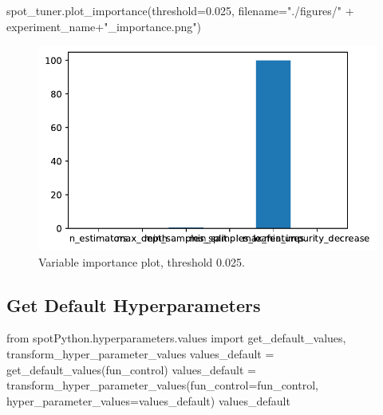 \documentclass[
  letterpaper,
  DIV=11,
  numbers=noendperiod]{scrreprt}
\newenvironment{Shaded}{\begin{snugshade}}{\end{snugshade}}
\newcommand{\FloatTok}[1]{\textcolor[rgb]{0.68,0.00,0.00}{#1}}
\newcommand{\ImportTok}[1]{\textcolor[rgb]{0.00,0.46,0.62}{#1}}
\newcommand{\NormalTok}[1]{\textcolor[rgb]{0.00,0.23,0.31}{#1}}
\newcommand{\OperatorTok}[1]{\textcolor[rgb]{0.37,0.37,0.37}{#1}}
\newcommand{\StringTok}[1]{\textcolor[rgb]{0.13,0.47,0.30}{#1}}
\begin{document}
\begin{Shaded}
\begin{Highlighting}[]
\NormalTok{spot\_tuner.plot\_importance(threshold}\OperatorTok{=}\FloatTok{0.025}\NormalTok{, filename}\OperatorTok{=}\StringTok{"./figures/"} \OperatorTok{+}\NormalTok{ experiment\_name}\OperatorTok{+}\StringTok{"\_importance.png"}\NormalTok{)}
\end{Highlighting}
\end{Shaded}

\begin{figure}[H]

{\centering \includegraphics{16_spot_hpt_sklearn_multiclass_classification_randomforest_files/figure-pdf/cell-29-output-1.pdf}

}

\caption{Variable importance plot, threshold 0.025.}

\end{figure}

\hypertarget{get-default-hyperparameters-3}{%
\subsection{Get Default
Hyperparameters}\label{get-default-hyperparameters-3}}

\begin{Shaded}
\begin{Highlighting}[]
\ImportTok{from}\NormalTok{ spotPython.hyperparameters.values }\ImportTok{import}\NormalTok{ get\_default\_values, transform\_hyper\_parameter\_values}
\NormalTok{values\_default }\OperatorTok{=}\NormalTok{ get\_default\_values(fun\_control)}
\NormalTok{values\_default }\OperatorTok{=}\NormalTok{ transform\_hyper\_parameter\_values(fun\_control}\OperatorTok{=}\NormalTok{fun\_control, hyper\_parameter\_values}\OperatorTok{=}\NormalTok{values\_default)}
\NormalTok{values\_default}
\end{Highlighting}
\end{Shaded}
\end{document}
